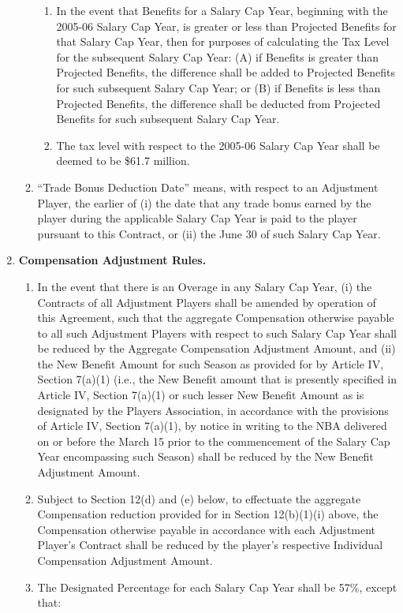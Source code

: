 \documentclass[
]{book}
\providecommand{\tightlist}{%
  \setlength{\itemsep}{0pt}\setlength{\parskip}{0pt}}
\begin{document}
\begin{enumerate}
\begin{enumerate}
\begin{enumerate}
    \item
      In the event that Benefits for a Salary Cap Year, beginning with the 2005-06 Salary Cap Year, is greater or less than Projected Benefits for that Salary Cap Year, then for purposes of calculating the Tax Level for the subsequent Salary Cap Year: (A) if Benefits is greater than Projected Benefits, the difference shall be added to Projected Benefits for such subsequent Salary Cap Year; or (B) if Benefits is less than Projected Benefits, the difference shall be deducted from Projected Benefits for such subsequent Salary Cap Year.
    \item
      The tax level with respect to the 2005-06 Salary Cap Year shall be deemed to be \$61.7 million.
    \end{enumerate}
  \item
    ``Trade Bonus Deduction Date'' means, with respect to an Adjustment Player, the earlier of (i) the date that any trade bonus earned by the player during the applicable Salary Cap Year is paid to the player pursuant to this Contract, or (ii) the June 30 of such Salary Cap Year.
  \end{enumerate}
\item
  \textbf{Compensation Adjustment Rules.}

  \begin{enumerate}
  \def\labelenumii{(\arabic{enumii})}
  \tightlist
  \item
    In the event that there is an Overage in any Salary Cap Year, (i) the Contracts of all Adjustment Players shall be amended by operation of this Agreement, such that the aggregate Compensation otherwise payable to all such Adjustment Players with respect to such Salary Cap Year shall be reduced by the Aggregate Compensation Adjustment Amount, and (ii) the New Benefit Amount for such Season as provided for by Article IV, Section 7(a)(1) (i.e., the New Benefit amount that is presently specified in Article IV, Section 7(a)(1) or such lesser New Benefit Amount as is designated by the Players Association, in accordance with the provisions of Article IV, Section 7(a)(1), by notice in writing to the NBA delivered on or before the March 15 prior to the commencement of the Salary Cap Year encompassing such Season) shall be reduced by the New Benefit Adjustment Amount.
  \item
    Subject to Section 12(d) and (e) below, to effectuate the aggregate Compensation reduction provided for in Section 12(b)(1)(i) above, the Compensation otherwise payable in accordance with each Adjustment Player's Contract shall be reduced by the player's respective Individual Compensation Adjustment Amount.
  \item
    The Designated Percentage for each Salary Cap Year shall be 57\%, except that:


\end{enumerate}
\end{enumerate}
\end{document}
